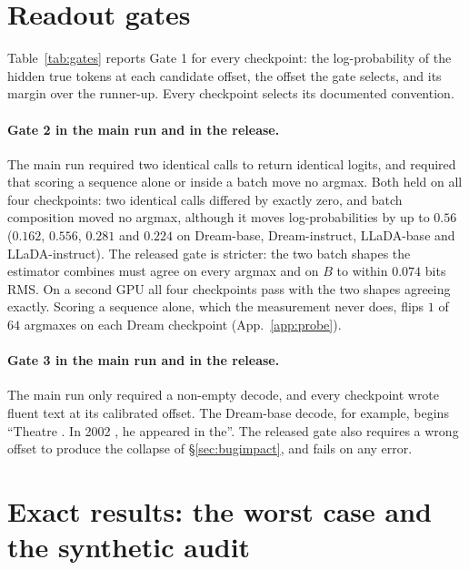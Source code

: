 \documentclass{article}
\begin{document}
\section{Readout gates}
\label{app:gates}
Table~\ref{tab:gates} reports Gate 1 for every checkpoint: the log-probability of the
hidden true tokens at each candidate offset, the offset the gate selects, and its margin
over the runner-up. Every checkpoint selects its documented convention.


\paragraph{Gate 2 in the main run and in the release.} The main run required two
identical calls to return identical logits, and required that scoring a sequence alone
or inside a batch move no argmax. Both held on all four checkpoints: two identical calls
differed by exactly zero, and batch composition moved no argmax, although it moves
log-probabilities by up to $0.56$ ($0.162$, $0.556$, $0.281$ and $0.224$ on Dream-base,
Dream-instruct, LLaDA-base and LLaDA-instruct). The released gate is stricter: the two
batch shapes the estimator combines must agree on every argmax and on $B$ to within
$0.074$ bits RMS. On a second GPU all four checkpoints pass with the two shapes agreeing
exactly. Scoring a sequence alone, which the measurement never does, flips $1$ of $64$
argmaxes on each Dream checkpoint (App.~\ref{app:probe}).

\paragraph{Gate 3 in the main run and in the release.} The main run only required a
non-empty decode, and every checkpoint wrote fluent text at its calibrated offset. The
Dream-base decode, for example, begins ``Theatre . In 2002 , he appeared in the''. The
released gate also requires a wrong offset to produce the collapse of
\S\ref{sec:bugimpact}, and fails on any error.

\section{Exact results: the worst case and the synthetic audit}
\label{app:exact}
\end{document}

